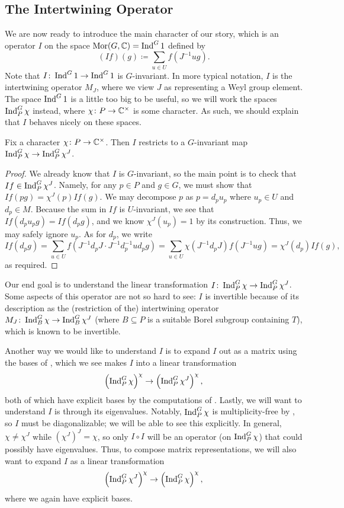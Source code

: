 \subsection{The Intertwining Operator}
We are now ready to introduce the main character of our story, which is an operator $I$ on the space $\operatorname{Mor}(G,\mathbb C)=\operatorname{Ind}^G1$ defined by
\[(If)(g)\coloneqq\sum_{u\in U}f\left(J^{-1}ug\right).\]
Note that $I\colon\operatorname{Ind}^G1\to\operatorname{Ind}^G1$ is $G$-invariant. In more typical notation, $I$ is the intertwining operator $M_J$, where we view $J$ as representing a Weyl group element. The space $\operatorname{Ind}^G1$ is a little too big to be useful, so we will work the spaces $\operatorname{Ind}_P^G\chi$ instead, where $\chi\colon P\to\mathbb C^\times$ is some character. As such, we should explain that $I$ behaves nicely on these spaces.
\begin{lemma} \label{lem:parabolic-intertwine}
    Fix a character $\chi\colon P\to\mathbb C^\times$. Then $I$ restricts to a $G$-invariant map $\operatorname{Ind}_P^G\chi\to\operatorname{Ind}_P^G\chi^J$.
\end{lemma}
\begin{proof}
    We already know that $I$ is $G$-invariant, so the main point is to check that $If\in\operatorname{Ind}_P^G\chi^J$. Namely, for any $p\in P$ and $g\in G$, we must show that $If(pg)=\chi^J(p)If(g)$. We may decompose $p$ as $p=d_pu_p$ where $u_p\in U$ and $d_p\in M$. Because the sum in $If$ is $U$-invariant, we see that $If(d_pu_pg)=If(d_pg)$, and we know $\chi^J(u_p)=1$ by its construction. Thus, we may safely ignore $u_p$. As for $d_p$, we write
    \[If(d_pg)=\sum_{u\in U}f\left(J^{-1}d_pJ\cdot J^{-1}d_p^{-1}ud_pg\right)=\sum_{u\in U}\chi\left(J^{-1}d_pJ\right)f(J^{-1}ug)=\chi^J(d_p)If(g),\]
    as required.
\end{proof}
Our end goal is to understand the linear transformation $I\colon\operatorname{Ind}^G_P\chi\to\operatorname{Ind}^G_P\chi^J$. Some aspects of this operator are not so hard to see: $I$ is invertible because of its description as the (restriction of the) intertwining operator $M_J\colon\operatorname{Ind}^G_B\chi\to\operatorname{Ind}^G_B\chi^J$ (where $B\subseteq P$ is a suitable Borel subgroup containing $T$), which is known to be invertible.

Another way we would like to understand $I$ is to expand $I$ out as a matrix using the bases of , which we see makes $I$ into a linear transformation
\[\left(\operatorname{Ind}^G_P\chi\right)^\chi\to\left(\operatorname{Ind}^G_P\chi^J\right)^\chi,\]
both of which have explicit bases by the computations of . Lastly, we will want to understand $I$ is through its eigenvalues. Notably, $\operatorname{Ind}_P^G\chi$ is multiplicity-free by , so $I$ must be diagonalizable; we will be able to see this explicitly. In general, $\chi\ne\chi^J$ while $\left(\chi^J\right)^J=\chi$, so only $I\circ I$ will be an operator (on $\operatorname{Ind}^G_P\chi$) that could possibly have eigenvalues. Thus, to compose matrix representations, we will also want to expand $I$ as a linear transformation
\[\left(\operatorname{Ind}^G_P\chi^J\right)^\chi\to\left(\operatorname{Ind}^G_P\chi\right)^\chi,\]
where we again have explicit bases.

